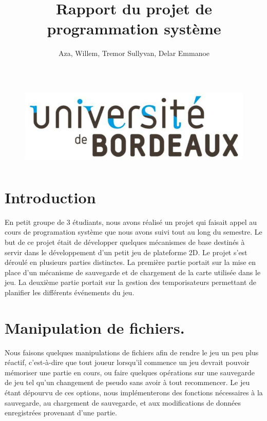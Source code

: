\documentclass{article}
\title{\textbf{Rapport du projet de programmation syst\`{e}me}}
\author{Aza, Willem, Tremor Sullyvan, Delar Emmanoe}
\begin{document}
\maketitle
\thispagestyle{fancy}

\begin{figure}[!b]
		\centering
		\includegraphics[height=4cm]{logo.jpg}
	\end{figure}

\newpage
\tableofcontents

\newpage
\section{Introduction}
En petit groupe de 3 \'etudiants, nous avons r\'ealis\'e un projet qui faisait appel au cours de programation syst\`eme que nous avons suivi tout au long du semestre. Le but de ce projet \'etait de d\'evelopper quelques m\'ecanismes de base destin\'es \`a servir dans le d\'eveloppement d'un petit jeu de plateforme 2D. Le projet s'est d\'eroul\'e en plusieurs parties distinctes. La premi\`ere partie portait sur la mise en place d'un m\'ecanisme de sauvegarde et de chargement de la carte utilis\'ee dans le jeu. La deuxi\`eme partie portait sur la gestion des temporisateurs permettant de planifier les diff\'erents \'ev\'enements du jeu.


\section{Manipulation de fichiers.}
Nous faisons quelques manipulations de fichiers afin de rendre le jeu un peu plus r\'eactif, c'est-\`a-dire que tout joueur lorsqu'il commence un jeu devrait pouvoir m\'emoriser une partie en cours, ou faire quelques op\'erations sur une sauvegarde de jeu tel qu'un changement de pseudo sans avoir \`a tout recommencer. Le jeu \'etant d\'epourvu de ces options, nous impl\'ementerons des fonctions n\'ecessaires \`a la sauvegarde, au chargement de sauvegarde, et aux modifications de donn\'ees enregistr\'ees provenant d'une partie.
\end{document}
